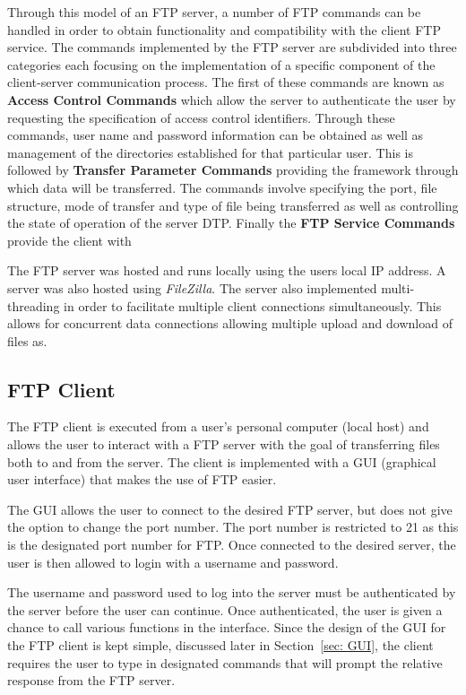 \documentclass[10pt,twocolumn]{witseiepaper}
\begin{document}
Through this model of an FTP server, a number of FTP commands can be handled in order to obtain functionality and compatibility with the client FTP service. The commands implemented by the FTP server are subdivided into three categories each focusing on the implementation of a specific component of the client-server communication process. The first of these commands are known as \textbf{Access Control Commands} which allow the server to authenticate the user by requesting the specification of access control identifiers. Through these commands, user name and password information can be obtained as well as management of the directories established for that particular user. This is followed by \textbf{Transfer Parameter Commands} providing the framework through which data will be transferred. The commands involve specifying the port, file structure, mode of transfer and type of file being transferred as well as controlling the state of operation of the server DTP. Finally the \textbf{FTP Service Commands} provide the client with 

The FTP server was hosted and runs locally using the users local IP address. A server was also hosted using \textit{FileZilla}. The server also implemented multi-threading in order to facilitate multiple client connections simultaneously. This allows for concurrent data connections allowing multiple upload and download of files as. 

\subsection{FTP Client}
\label{sec: FTP Client}
The FTP client is executed from a user's personal computer (local host) and allows the user to interact with a FTP server with the goal of transferring files both to and from the server. The client is implemented with a GUI (graphical user interface) that makes the use of FTP easier.

The GUI allows the user to connect to the desired FTP server, but does not give the option to change the port number. The port number is restricted to 21 as this is the designated port number for FTP. Once connected to the desired server, the user is then allowed to login with a username and password.

The username and password used to log into the server must be authenticated by the server before the user can continue. Once authenticated, the user is given a chance to call various functions in the interface. Since the design of the GUI for the FTP client is kept simple, discussed later in Section~\ref{sec: GUI}, the client requires the user to type in designated commands that will prompt the relative response from the FTP server.
\end{document}
